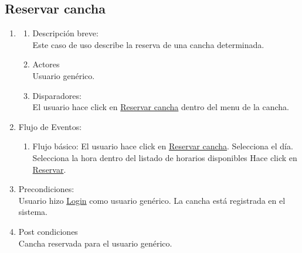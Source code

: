 \documentclass[a4paper,11pt]{article}
\begin{document}
\subsection{Reservar cancha}
\begin{enumerate}

    \item
    \begin{enumerate}
    \item Descripción breve: \\
        Este caso de uso describe la reserva de una cancha determinada.
    \item Actores \\
        Usuario genérico.
    \item Disparadores: \\
        El usuario hace click en \underline{Reservar cancha}
        dentro del menu de la cancha.
    \end{enumerate}

    \item Flujo de Eventos: 

    \begin{enumerate}

        \item Flujo básico:
            El usuario hace click en \underline{Reservar cancha}.
            Selecciona el día.
            Selecciona la hora dentro del listado de horarios disponibles
            Hace click en \underline{Reservar}.
    \end{enumerate}

    \item Precondiciones: \\
        Usuario hizo \underline{Login} como usuario genérico.
        La cancha está registrada en el sistema.

    \item Post condiciones \\
        Cancha reservada para el usuario genérico.

\end{enumerate}

\end{document}
